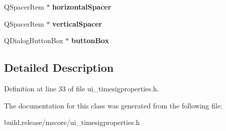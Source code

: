\begin{DoxyCompactItemize}
\item 
\mbox{\label{class_ui___time_sig_properties_a0f57182767987265713fb41adbcd65aa}} 
Q\+Spacer\+Item $\ast$ {\bfseries horizontal\+Spacer}
\item 
\mbox{\label{class_ui___time_sig_properties_aad6c4eca92562d2cd339bd5d77238a43}} 
Q\+Spacer\+Item $\ast$ {\bfseries vertical\+Spacer}
\item 
\mbox{\label{class_ui___time_sig_properties_af62221dcab4b18fd3500384eb3db2e6f}} 
Q\+Dialog\+Button\+Box $\ast$ {\bfseries button\+Box}
\end{DoxyCompactItemize}


\subsection{Detailed Description}


Definition at line 33 of file ui\+\_\+timesigproperties.\+h.



The documentation for this class was generated from the following file\+:\begin{DoxyCompactItemize}
\item 
build.\+release/mscore/ui\+\_\+timesigproperties.\+h\end{DoxyCompactItemize}
